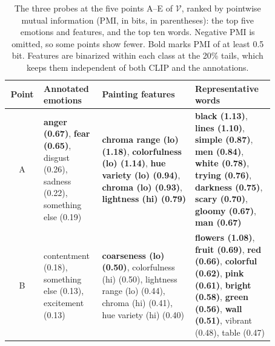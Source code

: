 \begin{table}[p]
    \centering\small
    \caption{The three probes at the five points A--E of $\mathcal{V}$,
        ranked by pointwise mutual information (PMI, in bits, in
        parentheses): the top five emotions and features, and the top ten
        words. Negative PMI is omitted, so some points show fewer. Bold
        marks PMI of at least 0.5 bit. Features are binarized within each
        class at the 20\% tails, which keeps them independent of both CLIP
        and the annotations.}
    \label{tab:point_tags_wikiart}
    \begin{tabular}{@{}c p{0.22\linewidth} p{0.35\linewidth} p{0.3\linewidth}@{}}
        \toprule
        \textbf{Point}             & \textbf{Annotated emotions}                                                                        &
        \textbf{Painting features} &
        \textbf{Representative words}                                                                                                                                                                                                                                                                                                                                                                                                                                                                                                                                    \\
        \midrule
        A                          & \textbf{anger (0.67)}, \textbf{fear (0.65)}, disgust (0.26), sadness (0.22), something else (0.19) & \textbf{chroma range (lo) (1.18)}, \textbf{colorfulness (lo) (1.14)}, \textbf{hue variety (lo) (0.94)}, \textbf{chroma (lo) (0.93)}, \textbf{lightness (hi) (0.79)}               & \textbf{black (1.13)}, \textbf{lines (1.10)}, \textbf{simple (0.87)}, \textbf{men (0.84)}, \textbf{white (0.78)}, \textbf{trying (0.76)}, \textbf{darkness (0.75)}, \textbf{scary (0.70)}, \textbf{gloomy (0.67)}, \textbf{man (0.67)}     \\
        \addlinespace
        B                          & contentment (0.18), something else (0.13), excitement (0.13)                                       & \textbf{coarseness (lo) (0.50)}, colorfulness (hi) (0.50), lightness range (lo) (0.44), chroma (hi) (0.41), hue variety (hi) (0.40)                                               & \textbf{flowers (1.08)}, \textbf{fruit (0.69)}, \textbf{red (0.66)}, \textbf{colorful (0.62)}, \textbf{pink (0.61)}, \textbf{bright (0.58)}, \textbf{green (0.56)}, \textbf{wall (0.51)}, vibrant (0.48), table (0.47)                     \\

\end{tabular}
\end{table}
